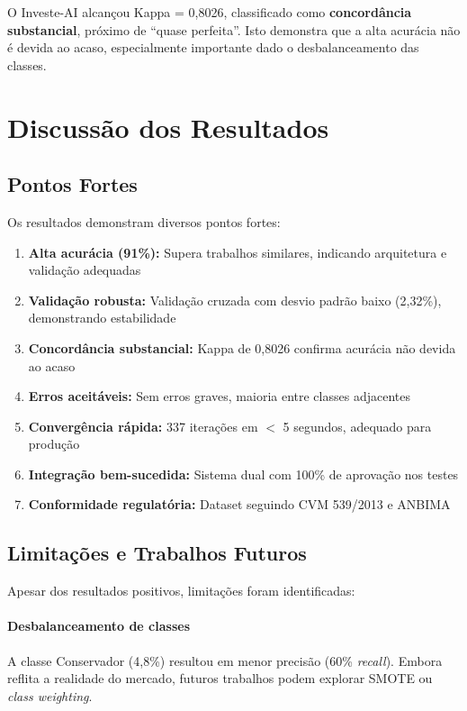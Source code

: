 O Investe-AI alcançou Kappa = 0,8026, classificado como \textbf{concordância substancial}, próximo de ``quase perfeita''. Isto demonstra que a alta acurácia não é devida ao acaso, especialmente importante dado o desbalanceamento das classes.

\section{Discussão dos Resultados}

\subsection{Pontos Fortes}

Os resultados demonstram diversos pontos fortes:

\begin{enumerate}
    \item \textbf{Alta acurácia (91\%):} Supera trabalhos similares, indicando arquitetura e validação adequadas
    \item \textbf{Validação robusta:} Validação cruzada com desvio padrão baixo (2,32\%), demonstrando estabilidade
    \item \textbf{Concordância substancial:} Kappa de 0,8026 confirma acurácia não devida ao acaso
    \item \textbf{Erros aceitáveis:} Sem erros graves, maioria entre classes adjacentes
    \item \textbf{Convergência rápida:} 337 iterações em $<$ 5 segundos, adequado para produção
    \item \textbf{Integração bem-sucedida:} Sistema dual com 100\% de aprovação nos testes
    \item \textbf{Conformidade regulatória:} Dataset seguindo CVM 539/2013 e ANBIMA
\end{enumerate}

\subsection{Limitações e Trabalhos Futuros}

Apesar dos resultados positivos, limitações foram identificadas:

\paragraph{Desbalanceamento de classes} A classe Conservador (4,8\%) resultou em menor precisão (60\% \textit{recall}). Embora reflita a realidade do mercado, futuros trabalhos podem explorar SMOTE ou \textit{class weighting}.

